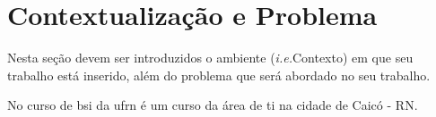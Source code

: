 

\section{Contextualização e Problema}
    \label{subsec:contextualizacao-problema}

    Nesta seção devem ser introduzidos o ambiente (\textit{i.e.}Contexto) em que seu trabalho está inserido, além do problema que será abordado no seu trabalho.
    
    No curso de \ac{bsi} da \ac{ufrn} é um curso da área de \ac{ti} na cidade de Caicó - RN.